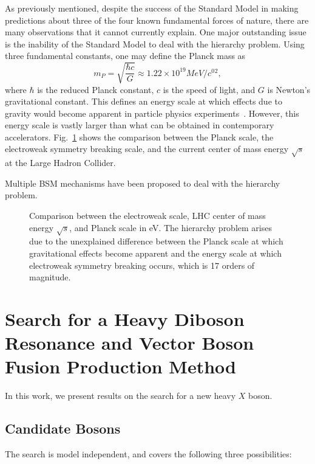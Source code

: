 As previously mentioned, despite the success of the Standard Model in making predictions about three of the four known fundamental forces of nature, there are many observations that it cannot currently explain.
One major outstanding issue is the inability of the Standard Model to deal with the hierarchy problem.
Using three fundamental constants, one may define the Planck mass as
\begin{equation}
  m_P=\sqrt{\frac{\hbar c}{G}}\approx1.22\times10^{19}\unit{MeV/\clight^2},
\end{equation}
where $\hbar$ is the reduced Planck constant, $c$ is the speed of light, and $G$ is Newton's gravitational constant.
This defines an energy scale at which effects due to gravity would become apparent in particle physics experiments~\cite{QFTNutshell}.
However, this energy scale is vastly larger than what can be obtained in contemporary accelerators.
Fig.~\ref{fig:hierarchy} shows the comparison between the Planck scale, the electroweak symmetry breaking scale, and the current center of mass energy $\sqrt{s}$ at the Large Hadron Collider.

Multiple BSM mechanisms have been proposed to deal with the hierarchy problem.


\begin{figure}[htbp]
  \centering
  
  \caption{Comparison between the electroweak scale, LHC center of mass energy $\sqrt{s}$, and Planck scale in eV. The hierarchy problem arises due to the unexplained difference between the Planck scale at which gravitational effects become apparent and the energy scale at which electroweak symmetry breaking occurs, which is 17 orders of magnitude.}
  \label{fig:hierarchy}
\end{figure}

\section{Search for a Heavy Diboson Resonance and Vector Boson Fusion Production Method}
\label{sec:VBF}

In this work, we present results on the search for a new heavy $X$ boson.

\subsection{Candidate Bosons}

The search is model independent, and covers the following three possibilities:

